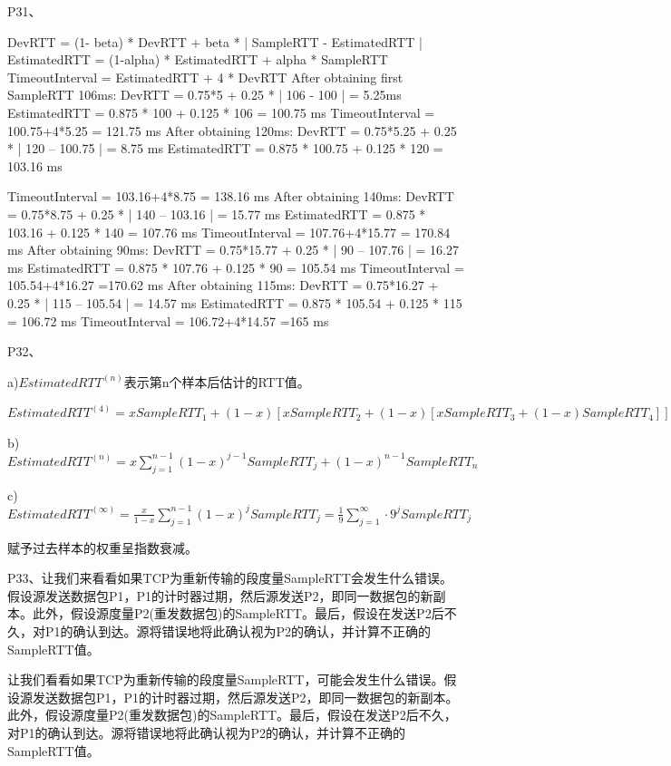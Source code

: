 \documentclass[11pt,UTF8,twoside]{article}
\begin{document}
	P31、
	
	DevRTT = (1- beta) * DevRTT + beta * | SampleRTT - EstimatedRTT | 
	EstimatedRTT = (1-alpha) * EstimatedRTT + alpha * SampleRTT 
	TimeoutInterval = EstimatedRTT + 4 * DevRTT 
	After obtaining first SampleRTT 106ms: 
	DevRTT = 0.75*5 + 0.25 * | 106 - 100 | = 5.25ms 
	EstimatedRTT = 0.875 * 100 + 0.125 * 106 = 100.75 ms 
	TimeoutInterval = 100.75+4*5.25 = 121.75 ms 
	After obtaining 120ms: 
	DevRTT = 0.75*5.25 + 0.25 * | 120 – 100.75 | = 8.75 ms 
	EstimatedRTT = 0.875 * 100.75 + 0.125 * 120 = 103.16 ms 
	
	TimeoutInterval = 103.16+4*8.75 = 138.16 ms 
	After obtaining 140ms: 
	DevRTT = 0.75*8.75 + 0.25 * | 140 – 103.16 | = 15.77 ms 
	EstimatedRTT = 0.875 * 103.16 + 0.125 * 140 = 107.76 ms 
	TimeoutInterval = 107.76+4*15.77 = 170.84 ms 
	After obtaining 90ms: 
	DevRTT = 0.75*15.77 + 0.25 * | 90 – 107.76 | = 16.27 ms 
	EstimatedRTT = 0.875 * 107.76 + 0.125 * 90 = 105.54 ms 
	TimeoutInterval = 105.54+4*16.27 =170.62 ms 
	After obtaining 115ms: 
	DevRTT = 0.75*16.27 + 0.25 * | 115 – 105.54 | = 14.57 ms 
	EstimatedRTT = 0.875 * 105.54 + 0.125 * 115 = 106.72 ms 
	TimeoutInterval = 106.72+4*14.57 =165 ms 
	
	P32、
	
	a)$EstimatedRTT^{(n)}$表示第n个样本后估计的RTT值。
	
	$EstimatedRTT^{(4)}=xSampleRTT_1+(1-x)[xSampleRTT_2+(1-x)[xSampleRTT_3+(1-x)SampleRTT_4]]=xSampleRTT_1+(1-x)xSampleRTT_2+(1-x)^2xSampleRTT_3+(1-x)^3xSampleRTT_4$
	
	b)$EstimatedRTT^{(n)}=x\sum_{j=1}^{n-1}(1-x)^{j-1}SampleRTT_j+(1-x)^{n-1}SampleRTT_n$
	
	c)$EstimatedRTT^{(\infty)}=\frac{x}{1-x}\sum_{j=1}^{n-1}(1-x)^{j}SampleRTT_j=\frac{1}{9}\sum_{j=1}^{\infty}\cdot9^jSampleRTT_j$
	
	赋予过去样本的权重呈指数衰减。
	
	P33、让我们来看看如果TCP为重新传输的段度量SampleRTT会发生什么错误。假设源发送数据包P1，P1的计时器过期，然后源发送P2，即同一数据包的新副本。此外，假设源度量P2(重发数据包)的SampleRTT。最后，假设在发送P2后不久，对P1的确认到达。源将错误地将此确认视为P2的确认，并计算不正确的SampleRTT值。
	
	让我们看看如果TCP为重新传输的段度量SampleRTT，可能会发生什么错误。假设源发送数据包P1，P1的计时器过期，然后源发送P2，即同一数据包的新副本。此外，假设源度量P2(重发数据包)的SampleRTT。最后，假设在发送P2后不久，对P1的确认到达。源将错误地将此确认视为P2的确认，并计算不正确的SampleRTT值。
	
\end{document}
